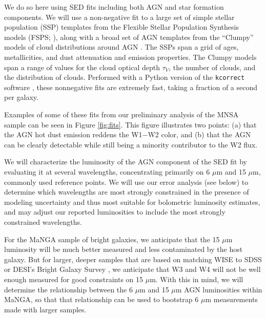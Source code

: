 \documentclass[12pt, preprint]{hacked-aastex}
\begin{document}

We do so here using SED fits including both AGN and star formation
components. We will use a non-negative fit to a large set of simple
stellar population (SSP) templates from the Flexible Stellar
Population Synthesis models (FSPS; \cite{conroy09a}), along with a
broad set of AGN templates from the ``Clumpy'' models of cloud
distributions around AGN \cite{nenkova08a}. The SSPs span a grid of
ages, metallicities, and dust attenuation and emission properties. The
Clumpy models span a range of values for the cloud optical depth
$\tau_V$, the number of clouds, and the distribution of
clouds. Performed with a Python version of the {\tt kcorrect} software
\cite{blanton07b}, these nonnegative fits are extremely fast, taking a
fraction of a second per galaxy.

Examples of some of these fits from our preliminary analysis of the
MNSA sample can be seen in Figure \ref{fig:fits}. This figure
illustrates two points: (a) that the AGN hot dust emission reddens the
W1$-$W2 color, and (b) that the AGN can be clearly detectable while
still being a minority contributor to the W2 flux.

We will characterize the luminosity of the AGN component of the SED
fit by evaluating it at several wavelengths, concentrating primarily
on 6 $\mu$m and 15 $\mu$m, commonly used reference points. We will use
our error analysis (see below) to determine which wavelengths are most
strongly constrained in the presence of modeling uncertainty and thus
most suitable for bolometric luminosity estimates, and may adjust our
reported luminosities to include the most strongly constrained
wavelengths.

For the MaNGA sample of bright galaxies, we anticipate that the 15
$\mu$m luminosity will be much better measured and less contaminated
by the host galaxy.  But for larger, deeper samples that are based on
matching WISE to SDSS or DESI's Bright Galaxy Survey \cite{assef18a,
  hviding22a}, we anticipate that W3 and W4 will not be well enough
measured for good constraints on 15 $\mu$m.  With this in mind, we
will determine the relationship between the 6 $\mu$m and 15 $\mu$m AGN
luminosities within MaNGA, so that that relationship can be used to
bootstrap 6 $\mu$m measurements made with larger samples.
\end{document}
